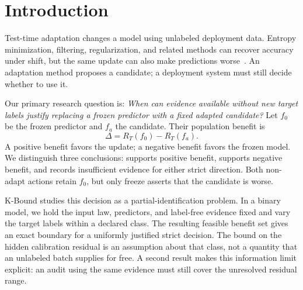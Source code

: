 \providecommand{\KBSuppRef}[3]{#2~\ref{#1}}


\section{Introduction}
\label{sec:compact-intro}

Test-time adaptation changes a model using unlabeled deployment data. Entropy minimization,
filtering, regularization, and related methods can recover accuracy under shift, but the same update
can also make predictions worse~\cite{wang2021tent,niu2022eata,niu2023sar,wang2022cotta}.
An adaptation method proposes a candidate; a deployment system must still decide whether to use it.

Our primary research question is:
\emph{When can evidence available without new target labels justify replacing a frozen predictor
with a fixed adapted candidate?}
Let $f_0$ be the frozen predictor and $f_a$ the candidate. Their population benefit is
\begin{equation}
  \Delta=R_T(f_0)-R_T(f_a).
  \label{eq:compact-benefit}
\end{equation}
A positive benefit favors the update; a negative benefit favors the frozen model. We distinguish
three conclusions: \adapt supports positive benefit, \freeze supports negative benefit, and
\abstain records insufficient evidence for either strict direction. Both non-adapt actions retain
$f_0$, but only freeze asserts that the candidate is worse.

K-Bound studies this decision as a partial-identification problem. In a binary model, we hold the
input law, predictors, and label-free evidence fixed and vary the target labels within a declared
class. The resulting feasible benefit set gives an exact boundary for a uniformly justified strict
decision. The bound on the hidden calibration residual is an assumption about that class, not a
quantity that an unlabeled batch supplies for free. A second result makes this information limit
explicit: an audit using the same evidence must still cover the unresolved residual range.

